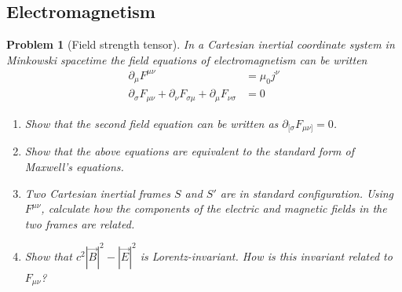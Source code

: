 \documentclass[a4paper]{article}
\theoremstyle{new2}
\theoremstyle{new}
\newtheorem{qns}{Problem}[section]
\begin{document}
\subsection*{Electromagnetism}
\begin{qns}[Field strength tensor]
In a Cartesian inertial coordinate system in Minkowski spacetime the field equations of electromagnetism can be written
\begin{align}
    \partial_\mu F^{\mu\nu}&=\mu_0j^\nu\nonumber\\
    \partial_\sigma F_{\mu\nu}+\partial_\nu F_{\sigma\mu}+\partial_\mu F_{\nu\sigma}&=0\nonumber
\end{align}
\begin{enumerate}[label=(\alph*)]
\item  Show that the second field equation can be written as $\partial_{[\sigma}F_{\mu\nu]}=0$. 
\item Show that the above equations are equivalent to the standard form of Maxwell’s equations.
\item Two Cartesian inertial frames $S$ and $S'$ are in standard configuration. Using $F^{\mu\nu}$, calculate how the components of the electric and magnetic fields in the two frames are related. 
\item  Show that $c^2|\vec{B}|^2-|\vec{E}|^2$ is Lorentz-invariant. How is this invariant related to $F_{\mu\nu}$?
\end{enumerate}
\end{qns}
\end{document}
